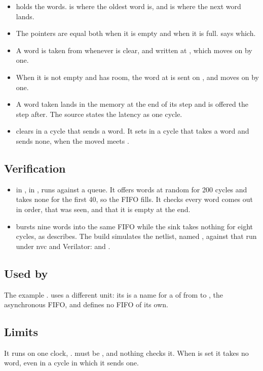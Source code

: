 \begin{itemize}
\item {} holds the words.  is where the oldest word
is, and  is where the next word lands.
\item The pointers are equal both when it is empty and when it is
full.  says which.
\item A word is taken from  whenever  is clear,
and written at , which moves on by one.
\item When it is not empty and  has room, the word at
 is sent on , and  moves on by one.
\item A word taken lands in the memory at the end of its step and is
offered the step after. The source states the latency as one cycle.
\item {} clears in a cycle that sends a word. It sets in a
cycle that takes a word and sends none, when the moved 
meets .
\end{itemize}

\subsection*{Verification}

\begin{itemize}
\item {} in
, in , runs
 against a queue. It offers words at random
for 200 cycles and takes none for the first 40, so the FIFO fills. It
checks every word comes out in order, that  was seen, and
that it is empty at the end.
\item {} bursts nine words into the same FIFO while the
sink takes nothing for eight cycles, as 
describes. The build simulates the netlist, named ,
against that run under nvc and Verilator:
 and
.
\end{itemize}

\subsection*{Used by}

The example .  uses a different unit:
its  is a name for a  of  from 
to ,
the asynchronous FIFO, and defines no FIFO of its own.

\subsection*{Limits}

It runs on one clock, .  must be
, and nothing checks it. When  is set it
takes no word, even in a cycle in which it sends one.
